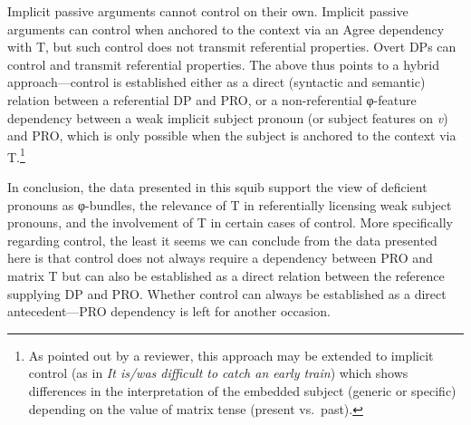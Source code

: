 \documentclass[output=paper]{langsci/langscibook}
\begin{document}
\ea
	\ea Implicit passive arguments cannot control on their own.
	\ex Implicit passive arguments can control when anchored to the context via an Agree dependency with T, but such control does not transmit referential properties.
	\ex Overt DPs can control and transmit referential properties.
	\z
\z
%
The above thus points to a hybrid approach—control is established either as a
direct (syntactic and semantic)  relation between a referential DP and
PRO, or a non-referential φ-feature dependency between a weak implicit subject
pronoun (or subject features on \emph{v}) and PRO, which is only possible when
the subject is anchored to the context via T.\footnote{As pointed out by a
    reviewer, this approach may be extended to implicit control (as in \emph{It
    is/was difficult to catch an early train}) which shows differences in the
interpretation of the embedded subject (generic or specific) depending on the
value of matrix tense (present vs.\ past).}

In conclusion, the data presented in this squib support the view of deficient
pronouns as φ-bundles, the relevance of T in referentially licensing weak
subject pronouns, and the involvement of T in certain cases of control. More
specifically regarding control, the least it seems we can conclude from the
data presented here is that control does not always require a dependency
between PRO and matrix T but can also be established as a direct relation
between the reference supplying DP and PRO. Whether control can always be
established as a direct antecedent—PRO dependency is left for another occasion.

\printchapterglossary{}

{\sloppy
\printbibliography[heading=subbibliography,notkeyword=this]
}
\end{document}
